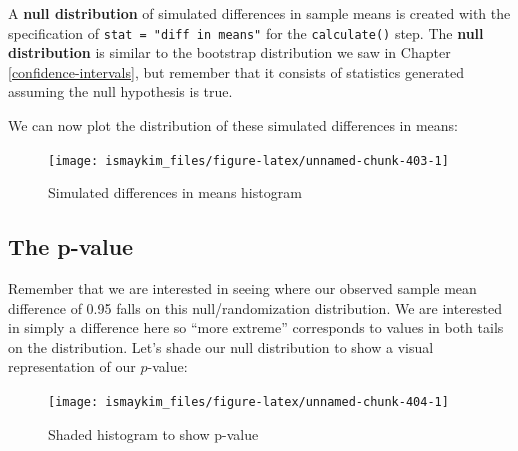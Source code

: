 \documentclass[12pt,]{krantz}
\makeatletter
\newenvironment{Shaded}{\begin{snugshade}}{\end{snugshade}}
\newcommand{\KeywordTok}[1]{\textcolor[rgb]{0.27,0.27,0.27}{\textbf{#1}}}
\newcommand{\DataTypeTok}[1]{\textcolor[rgb]{0.27,0.27,0.27}{#1}}
\newcommand{\StringTok}[1]{\textcolor[rgb]{0.5,0.5,0.5}{#1}}
\newcommand{\OperatorTok}[1]{\textcolor[rgb]{0.43,0.43,0.43}{\textbf{#1}}}
\newcommand{\NormalTok}[1]{#1}
\newenvironment{kframe}{%
\medskip{}
\setlength{\fboxsep}{.8em}
 \def\at@end@of@kframe{}%
 \ifinner\ifhmode%
  \def\at@end@of@kframe{\end{minipage}}%
  \begin{minipage}{\columnwidth}%
 \fi\fi%
 \def\FrameCommand##1{\hskip\@totalleftmargin \hskip-\fboxsep
 \colorbox{shadecolor}{##1}\hskip-\fboxsep
     \hskip-\linewidth \hskip-\@totalleftmargin \hskip\columnwidth}%
 \MakeFramed {\advance\hsize-\width
   \@totalleftmargin\z@ \linewidth\hsize
   \@setminipage}}%
 {\par\unskip\endMakeFramed%
 \at@end@of@kframe}
\renewenvironment{Shaded}{\begin{kframe}}{\end{kframe}}
\theoremstyle{definition}
\theoremstyle{definition}
\theoremstyle{definition}
\theoremstyle{remark}
\makeatother
\begin{document}
A \textbf{null distribution} of simulated differences in sample means is
created with the specification of \texttt{stat\ =\ "diff\ in\ means"}
for the \texttt{calculate()} step. The \textbf{null distribution} is
similar to the bootstrap distribution we saw in Chapter
\ref{confidence-intervals}, but remember that it consists of statistics
generated assuming the null hypothesis is true.

We can now plot the distribution of these simulated differences in
means:

\begin{Shaded}
\end{Shaded}

\begin{figure}

{\centering \texttt{[image: ismaykim\_files/figure-latex/unnamed-chunk-403-1]} 

}

\caption{Simulated differences in means histogram}\label{fig:unnamed-chunk-403}
\end{figure}

\subsection{The p-value}\label{the-p-value}

Remember that we are interested in seeing where our observed sample mean
difference of 0.95 falls on this null/randomization distribution. We are
interested in simply a difference here so ``more extreme'' corresponds
to values in both tails on the distribution. Let's shade our null
distribution to show a visual representation of our \(p\)-value:

\begin{Shaded}
\end{Shaded}

\begin{figure}

{\centering \texttt{[image: ismaykim\_files/figure-latex/unnamed-chunk-404-1]} 

}

\caption{Shaded histogram to show p-value}\label{fig:unnamed-chunk-404}
\end{figure}
\end{document}
